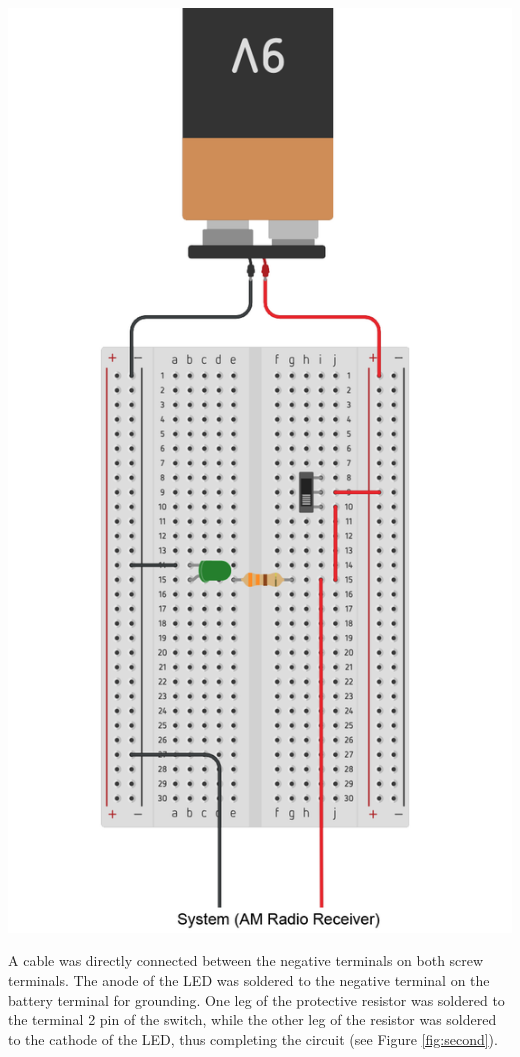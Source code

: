 \documentclass[journal]{IEEEtran}
\begin{document}
\begingroup
    \medskip
    \centering
    \includegraphics[scale=0.43]{images/lab2_2.png}
    \label{fig:third}
    \medskip
\endgroup

\noindent A cable was directly connected between the negative terminals on both screw terminals.  The anode of the LED was soldered to the negative terminal on the battery terminal for grounding. One leg of the protective resistor was soldered to the terminal 2 pin of the switch, while the other leg of the resistor was soldered to the cathode of the LED, thus completing the circuit (see Figure \ref{fig:second}).
\end{document}
